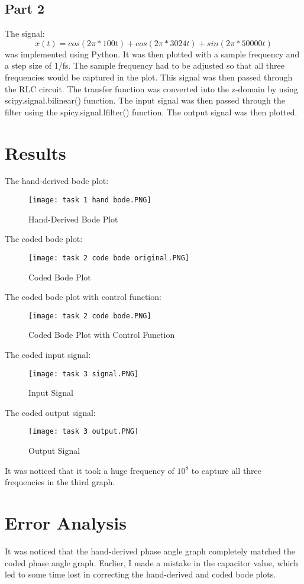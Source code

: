 \documentclass[12pt]{article}
\begin{document}
\subsection{Part 2}
The signal:
\[x(t) = cos(2\pi * 100t) + cos(2\pi * 3024t) + sin(2\pi * 50000t)\]
was implemented using Python. It was then plotted with a sample frequency and a step size of 1/fs. The sample frequency had to be adjusted so that all three frequencies would be captured in the plot.
This signal was then passed through the RLC circuit. The transfer function was converted into the z-domain by using scipy.signal.bilinear() function. The input signal was then passed through the filter using the spicy.signal.lfilter() function. The output signal was then plotted.
\section{Results}
The hand-derived bode plot:
\begin{figure}[H]
\texttt{[image: task 1 hand bode.PNG]}
  \caption{Hand-Derived Bode Plot}
  \end{figure}
The coded bode plot:
\begin{figure}[H]
\texttt{[image: task 2 code bode original.PNG]}
  \caption{Coded Bode Plot}
  \end{figure}  
The coded bode plot with control function:
\begin{figure}[H]
\texttt{[image: task 2 code bode.PNG]}
  \caption{Coded Bode Plot with Control Function}
  \end{figure}
The coded input signal:  
\begin{figure}[H]
\texttt{[image: task 3 signal.PNG]}
  \caption{Input Signal}
  \end{figure}  
The coded output signal:
\begin{figure}[H]
\texttt{[image: task 3 output.PNG]} 
  \caption{Output Signal}
  \end{figure}

It was noticed that it took a huge frequency of $10^8$ to capture all three frequencies in the third graph. 
\newline

\section{Error Analysis}
It was noticed that the hand-derived phase angle graph  completely matched the coded phase angle graph. Earlier, I made a mistake in the capacitor value, which led to some time lost in correcting the hand-derived and coded bode plots.
\end{document}
